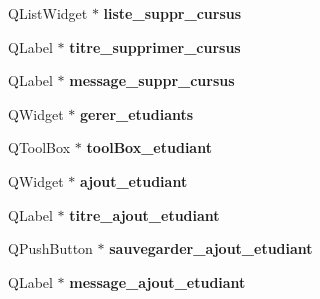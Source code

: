 \begin{DoxyCompactItemize}
\item 
\hypertarget{class_ui___administration_a0a117e70cfe4d890693ad4d87e4011de}{Q\+List\+Widget $\ast$ {\bfseries liste\+\_\+suppr\+\_\+cursus}}\label{class_ui___administration_a0a117e70cfe4d890693ad4d87e4011de}

\item 
\hypertarget{class_ui___administration_a691285a4e318556b253b2dcbe78d7bca}{Q\+Label $\ast$ {\bfseries titre\+\_\+supprimer\+\_\+cursus}}\label{class_ui___administration_a691285a4e318556b253b2dcbe78d7bca}

\item 
\hypertarget{class_ui___administration_a38a1761365626a105ea3534dd01668e1}{Q\+Label $\ast$ {\bfseries message\+\_\+suppr\+\_\+cursus}}\label{class_ui___administration_a38a1761365626a105ea3534dd01668e1}

\item 
\hypertarget{class_ui___administration_a41eca9be96f2ad3985d6ad13c41c91f4}{Q\+Widget $\ast$ {\bfseries gerer\+\_\+etudiants}}\label{class_ui___administration_a41eca9be96f2ad3985d6ad13c41c91f4}

\item 
\hypertarget{class_ui___administration_a537ff589329527ec93d326bf413056dc}{Q\+Tool\+Box $\ast$ {\bfseries tool\+Box\+\_\+etudiant}}\label{class_ui___administration_a537ff589329527ec93d326bf413056dc}

\item 
\hypertarget{class_ui___administration_a077f6131ba9997f3d8334711134574cb}{Q\+Widget $\ast$ {\bfseries ajout\+\_\+etudiant}}\label{class_ui___administration_a077f6131ba9997f3d8334711134574cb}

\item 
\hypertarget{class_ui___administration_a5cef370f000b2b95e6d393dfebbddbe3}{Q\+Label $\ast$ {\bfseries titre\+\_\+ajout\+\_\+etudiant}}\label{class_ui___administration_a5cef370f000b2b95e6d393dfebbddbe3}

\item 
\hypertarget{class_ui___administration_a14f251e972568e71d34db13c90f3265f}{Q\+Push\+Button $\ast$ {\bfseries sauvegarder\+\_\+ajout\+\_\+etudiant}}\label{class_ui___administration_a14f251e972568e71d34db13c90f3265f}

\item 
\hypertarget{class_ui___administration_a92b6c3962e03fbddbca974e80d2c0a09}{Q\+Label $\ast$ {\bfseries message\+\_\+ajout\+\_\+etudiant}}\label{class_ui___administration_a92b6c3962e03fbddbca974e80d2c0a09}


\end{DoxyCompactItemize}
